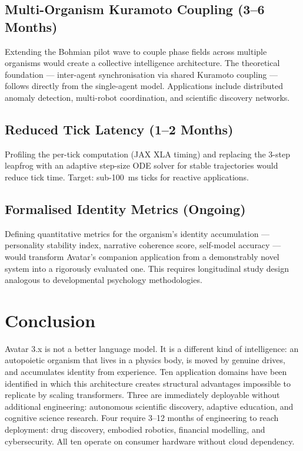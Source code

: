 \documentclass[12pt,a4paper]{article}
\begin{document}
\subsection{Multi-Organism Kuramoto Coupling (3--6 Months)}

Extending the Bohmian pilot wave to couple phase fields across multiple organisms would
create a collective intelligence architecture. The theoretical foundation --- inter-agent
synchronisation via shared Kuramoto coupling --- follows directly from the single-agent
model. Applications include distributed anomaly detection, multi-robot coordination,
and scientific discovery networks.

\subsection{Reduced Tick Latency (1--2 Months)}

Profiling the per-tick computation (JAX XLA timing) and replacing the 3-step leapfrog
with an adaptive step-size ODE solver for stable trajectories would reduce tick time.
Target: sub-100~ms ticks for reactive applications.

\subsection{Formalised Identity Metrics (Ongoing)}

Defining quantitative metrics for the organism's identity accumulation --- personality
stability index, narrative coherence score, self-model accuracy --- would transform
Avatar's companion application from a demonstrably novel system into a rigorously
evaluated one. This requires longitudinal study design analogous to developmental
psychology methodologies.

\section{Conclusion}

Avatar 3.x is not a better language model. It is a different kind of intelligence: an
autopoietic organism that lives in a physics body, is moved by genuine drives, and
accumulates identity from experience. Ten application domains have been identified in
which this architecture creates structural advantages impossible to replicate by scaling
transformers. Three are immediately deployable without additional engineering: autonomous
scientific discovery, adaptive education, and cognitive science research. Four require
3--12 months of engineering to reach deployment: drug discovery, embodied robotics,
financial modelling, and cybersecurity. All ten operate on consumer hardware without
cloud dependency.
\end{document}
